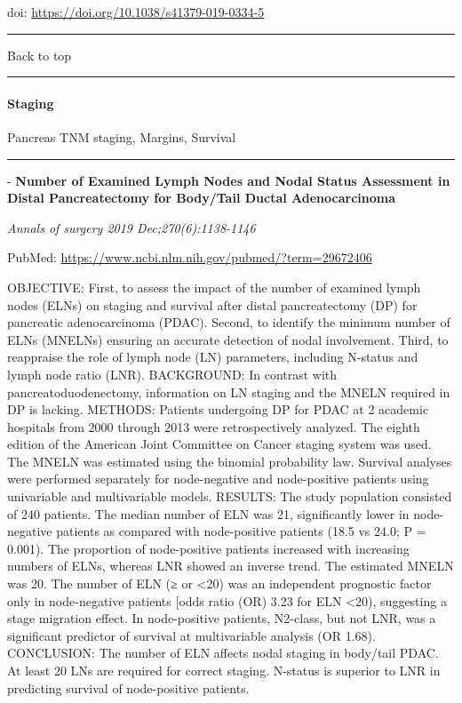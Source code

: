 \documentclass[
]{article}
\renewcommand{\linethickness}{0.05em}
\begin{document}
doi: \url{https://doi.org/10.1038/s41379-019-0334-5}

\begin{center}\rule{0.5\linewidth}{\linethickness}\end{center}

Back to top

\begin{center}\rule{0.5\linewidth}{\linethickness}\end{center}

\pagebreak

\hypertarget{pancreas_staging}{%
\paragraph{Staging}\label{pancreas_staging}}

Pancreas TNM staging, Margins, Survival

\begin{center}\rule{0.5\linewidth}{\linethickness}\end{center}

- \textbf{Number of Examined Lymph Nodes and Nodal Status Assessment in
Distal Pancreatectomy for Body/Tail Ductal Adenocarcinoma}

\emph{Annals of surgery 2019 Dec;270(6):1138-1146}

PubMed: \url{https://www.ncbi.nlm.nih.gov/pubmed/?term=29672406}

OBJECTIVE: First, to assess the impact of the number of examined lymph
nodes (ELNs) on staging and survival after distal pancreatectomy (DP)
for pancreatic adenocarcinoma (PDAC). Second, to identify the minimum
number of ELNs (MNELNs) ensuring an accurate detection of nodal
involvement. Third, to reappraise the role of lymph node (LN)
parameters, including N-status and lymph node ratio (LNR). BACKGROUND:
In contrast with pancreatoduodenectomy, information on LN staging and
the MNELN required in DP is lacking. METHODS: Patients undergoing DP for
PDAC at 2 academic hospitals from 2000 through 2013 were retrospectively
analyzed. The eighth edition of the American Joint Committee on Cancer
staging system was used. The MNELN was estimated using the binomial
probability law. Survival analyses were performed separately for
node-negative and node-positive patients using univariable and
multivariable models. RESULTS: The study population consisted of 240
patients. The median number of ELN was 21, significantly lower in
node-negative patients as compared with node-positive patients (18.5 vs
24.0; P = 0.001). The proportion of node-positive patients increased
with increasing numbers of ELNs, whereas LNR showed an inverse trend.
The estimated MNELN was 20. The number of ELN (≥ or \textless20) was an
independent prognostic factor only in node-negative patients {[}odds
ratio (OR) 3.23 for ELN \textless20), suggesting a stage migration
effect. In node-positive patients, N2-class, but not LNR, was a
significant predictor of survival at multivariable analysis (OR 1.68).
CONCLUSION: The number of ELN affects nodal staging in body/tail PDAC.
At least 20 LNs are required for correct staging. N-status is superior
to LNR in predicting survival of node-positive patients.
\end{document}
